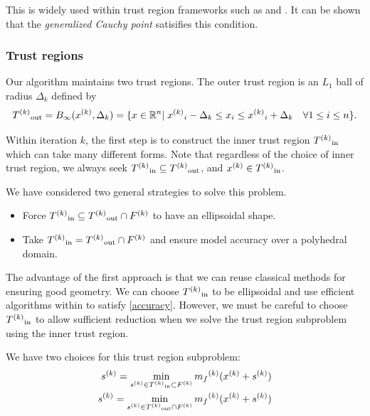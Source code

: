 This is widely used within trust region frameworks such as \cite{Conejo:2013:GCT:2620806.2621814} and \cite{Conn:2000:TM:357813}.
It can be shown that the \emph{generalized Cauchy point} satisifies this condition.


\subsubsection{Trust regions}
Our algorithm maintains two trust regions.
The outer trust region is an $L_1$ ball of radius $\Delta_k$ defined by
\begin{equation}
\label{trust_region}
{T^{(k)}}_{\text{out}} = B_{\infty}({x}^{(k)},\Delta_k) = \{x\in \mathbb R^n | \; {{x}^{(k)}}_i - \Delta_k \le x_i \le {{x}^{(k)}}_i + \Delta_k \quad \forall 1\le i \le n\}.
\end{equation}

Within iteration $k$, the first step is to construct the inner trust region ${T^{(k)}}_{\text{in}}$ which can take many different forms.
Note that regardless of the choice of inner trust region, we always seek
${T^{(k)}}_{\text{in}} \subseteq {T^{(k)}}_{\text{out}} $, and ${x}^{(k)} \in {T^{(k)}}_{\text{in}}$.


We have considered two general strategies to solve this problem.

\begin{itemize}
\item Force $\label{bluepill} {T^{(k)}}_{\text{in}} \subseteq {T^{(k)}}_{\text{out}} \cap {F}^{(k)}$ to have an ellipsoidal shape.
\item Take $\label{redpill} {T^{(k)}}_{\text{in}} = {T^{(k)}}_{\text{out}} \cap {F}^{(k)}$ and ensure model accuracy over a polyhedral domain.
\end{itemize}

The advantage of the first approach is that we can reuse classical methods for ensuring good geometry.
We can choose ${T^{(k)}}_{\text{in}}$ to be ellipsoidal and use efficient algorithms within \cite{DUMMY:intro_book} to satisfy \ref{accuracy}.
However, we must be careful to choose ${T^{(k)}}_{\text{in}}$ to allow sufficient reduction when we solve the trust region subproblem using the inner trust region.


We have two choices for this trust region subproblem:
\begin{align}
{s}^{(k)} = \min_{{s}^{(k)} \in {T^{(k)}}_{\text{in}} \subset {F}^{(k)}} {{m}_f}^{(k)}({x}^{(k)} + {s}^{(k)}) \\
{s}^{(k)} = \min_{{s}^{(k)} \in {T^{(k)}}_{\text{out}} \cap {F}^{(k)}} {{m}_f}^{(k)}({x}^{(k)} + {s}^{(k)})
\end{align}

